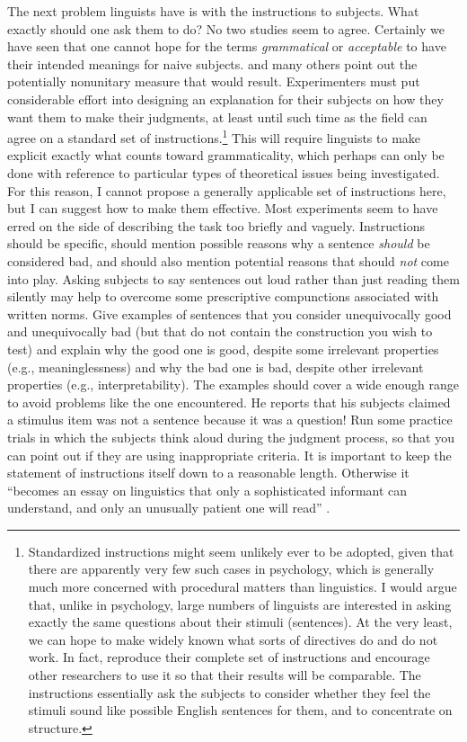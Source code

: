  The next problem linguists have is with the instructions to subjects. What exactly should one ask them to do? No two studies seem to agree. Certainly we have seen that one cannot hope for the terms \textit{grammatical} or \textit{acceptable} to have their intended meanings for naive subjects. \citet{Chaudron1983} and many others point out the potentially nonunitary measure that would result. Experimenters must put considerable effort into designing an explanation for their subjects on how they want them to make their judgments, at least until such time as the field can agree on a standard set of instructions.\footnote{ Standardized instructions might seem unlikely ever to be adopted, given that there are apparently very few such cases in psychology, which is generally much more concerned with procedural matters than linguistics. I would argue that, unlike in psychology, large numbers of linguists are interested in asking exactly the same questions about their stimuli (sentences). At the very least, we can hope to make widely known what sorts of directives do and do not work. In fact, \citet{BleyVromanEtAl1988} reproduce their complete set of instructions and encourage other researchers to use it so that their results will be comparable. The instructions essentially ask the subjects to consider whether they feel the stimuli sound like possible English sentences for them, and to concentrate on structure.
 }
 This will require linguists to make explicit exactly what counts toward grammaticality, which perhaps can only be done with reference to particular types of theoretical issues being investigated. For this reason, I cannot propose a generally applicable set of instructions here, but I can suggest how to make them effective. Most experiments seem to have erred on the side of describing the task too briefly and vaguely. Instructions should be specific, should mention possible reasons why a sentence \textit{should} be considered bad, and should also mention potential reasons that should \textit{not} come into play. Asking subjects to say sentences out loud rather than just reading them silently may help to overcome some prescriptive compunctions associated with written norms. Give examples of sentences that you consider unequivocally good and unequivocally bad (but that do not contain the construction you wish to test) and explain why the good one is good, despite some irrelevant properties (e.g., meaninglessness) and why the bad one is bad, despite other irrelevant properties (e.g., interpretability). The examples should cover a wide enough range to avoid problems like the one \citet{Birdsong1989} encountered. He reports that his subjects claimed a stimulus item was not a sentence because it was a question! Run some practice trials in which the subjects think aloud during the judgment process, so that you can point out if they are using inappropriate criteria. It is important to keep the statement of instructions itself down to a reasonable length. Otherwise it ``becomes an essay on linguistics that only a sophisticated informant can understand, and only an unusually patient one will read'' \citep[296]{Carden1970a}.



